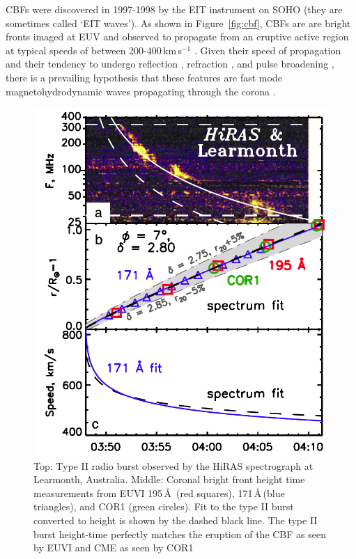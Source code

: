 CBFs were discovered in 1997-1998 \citep{moses1997, thompson1998} by the EIT instrument on SOHO (they are sometimes called `EIT waves'). As shown in Figure~\ref{fig:cbf}, CBFs are are bright fronts imaged at EUV and observed to propagate from an eruptive active region at typical speeds of between 200-400\,km\,s$^{-1}$ \citep{thompson2009}. Given their speed of propagation and their tendency to undergo reflection \citep{gopal2009}, refraction \citep{wang2000}, and pulse broadening \citep{long2011}, there is a prevailing hypothesis that these features are fast mode magnetohydrodynamic waves propagating through the corona \citep{veronig2010}.
\begin{figure}[!t]
\begin{center}
\includegraphics[trim=3cm 0cm 0cm 2cm, scale=0.3]{images/grechnev2011}
\caption[Comparison of EUV wave and type II height-time]{Top: Type II radio burst observed by the HiRAS spectrograph at Learmonth, Australia. Middle: Coronal bright front height time measurements from EUVI 195\,\AA\, (red squares), 171\,\AA\,(blue triangles), and COR1 (green circles). Fit to the type II burst converted to height is shown by the dashed black line. The type II burst height-time perfectly matches the eruption of the CBF as seen by EUVI and CME as seen by COR1 \citep{grechnev2011a}}
\label{fig:typeII_cbf}
\end{center}
\end{figure}
